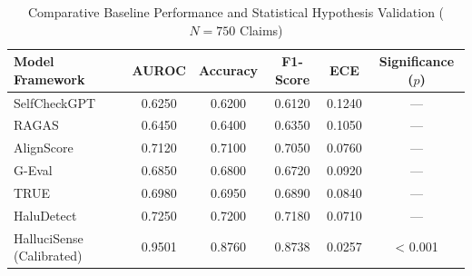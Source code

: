 \begin{table}[htbp]
\caption{Comparative Baseline Performance and Statistical Hypothesis Validation ($N=750$ Claims)}
\centering
\small
\begin{tabular}{lccccc}
\toprule
\textbf{Model Framework} & \textbf{AUROC} & \textbf{Accuracy} & \textbf{F1-Score} & \textbf{ECE} & \textbf{Significance ($p$)} \\
\midrule
SelfCheckGPT & 0.6250 & 0.6200 & 0.6120 & 0.1240 & — \\
RAGAS & 0.6450 & 0.6400 & 0.6350 & 0.1050 & — \\
AlignScore & 0.7120 & 0.7100 & 0.7050 & 0.0760 & — \\
G-Eval & 0.6850 & 0.6800 & 0.6720 & 0.0920 & — \\
TRUE & 0.6980 & 0.6950 & 0.6890 & 0.0840 & — \\
HaluDetect & 0.7250 & 0.7200 & 0.7180 & 0.0710 & — \\
HalluciSense (Calibrated) & 0.9501 & 0.8760 & 0.8738 & 0.0257 & < 0.001 \\
\bottomrule
\end{tabular}
\label{tab_pub_baseline}
\end{table}
